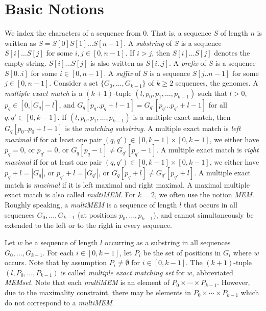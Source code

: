 \documentclass[12pt]{article}
\newcommand{\Size}[1]{|#1|}
\newcommand{\Subchar}[2]{#1[#2]}
\newcommand{\Substring}[3]{#1[#2..#3]}
\newcommand{\MultiMatch}[2]{(#1,#2_{0},#2_{1},\ldots,#2_{k-1})}
\newcommand{\MMEM}[0]{\textit{multiMEM}\xspace}
\newcommand{\MEM}[0]{\textit{MEM}\xspace}
\newcommand{\MEMset}[0]{\textit{MEMset}\xspace}
\begin{document}
\section{Basic Notions}\label{BasicNotions}
We index the characters of a sequence from \(0\). That is, a sequence
\(S\) of length \(n\) is written as 
\(S=\Subchar{S}{0}\Subchar{S}{1}\ldots\Subchar{S}{n-1}\).
A \emph{substring} of \(S\) is a sequence \(\Subchar{S}{i}\ldots\Subchar{S}{j}\)
for some \(i,j\in[0,n-1]\). If \(i>j\), then
\(\Subchar{S}{i}\ldots\Subchar{S}{j}\) denotes the empty
string. \(\Subchar{S}{i}\ldots\Subchar{S}{j}\) is also written as
\(\Substring{S}{i}{j}\).
A \emph{prefix} of \(S\) is a sequence \(\Substring{S}{0}{i}\) for some
\(i\in[0,n-1]\). A \emph{suffix} of \(S\) is a sequence 
\(\Substring{S}{j}{n-1}\) for some \(j\in[0,n-1]\).
Consider a set \(\{G_{0},\ldots,G_{k-1}\}\) of \(k\geq 2\) sequences,
the genomes. A \emph{multiple exact match}
is a \((k+1)\)-tuple \(\MultiMatch{l}{p}\) such that \(l>0\),
\(p_{q}\in[0,\Size{G_{q}}-l]\), and
\(\Substring{G_{q}}{p_{q}}{p_{q}+l-1}=\Substring{G_{q'}}{p_{q'}}{p_{q'}+l-1}\)
for all \(q,q'\in[0,k-1]\). If \(\MultiMatch{l}{p}\) is a multiple exact match,
then \(\Substring{G_{q}}{p_{0}}{p_{0}+l-1}\) is the \emph{matching substring}.
A multiple exact match is \emph{left maximal} if
for at least one pair \((q,q')\in[0,k-1]\times[0,k-1]\),
we either have \(p_{q}=0\), or \(p_{q'}=0\), or
\(\Subchar{G_{q}}{p_{q}-1}\neq\Subchar{G_{q'}}{p_{q'}-1}\).
A multiple exact match is \emph{right maximal} if
for at least one pair \((q,q')\in[0,k-1]\times[0,k-1]\),
we either have
\(p_{q}+l=\Size{G_{q}}\), or
\(p_{q'}+l=\Size{G_{q'}}\), or
\(\Subchar{G_{q}}{p_{q}+l}\neq\Subchar{G_{q'}}{p_{q'}+l}\).
A multiple exact match is \emph{maximal} if it is left maximal and right
maximal. A maximal multiple exact match is also called \MMEM.
For \(k=2\), we often use the notion \MEM.
Roughly speaking, a \MMEM is a sequence of length $l$ that
occurs in all sequences $G_{0},\ldots,G_{k-1}$
(at positions $p_{0},\ldots,p_{k-1}$),
and cannot simultaneously be extended to the left or to the right
in every sequence.

Let \(w\) be a sequence of length \(l\) occurring as a substring 
in all sequences
\(G_{0},\ldots,G_{k-1}\). For each \(i\in[0,k-1]\), let
\(P_{i}\) be the set of positions in $G_{i}$ where \(w\) occurs.
Note that by assumption \(P_{i}\neq\emptyset\) for \(i\in[0,k-1]\).
The \((k+1)\)-tuple \((l,P_{0},\ldots,P_{k-1})\) is called
\emph{multiple exact matching set} for \(w\), abbreviated
\MEMset. Note that each \MMEM is an element of 
\(P_{0}\times\cdots\times P_{k-1}\).
However, due to the maximality constraint, there may be elements
in \(P_{0}\times\cdots\times P_{k-1}\) which do not correspond to a \MMEM.
\end{document}
